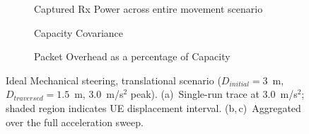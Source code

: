 \documentclass[fleqn,10pt]{wlscirep}
\begin{document}

\begin{figure}[ht!]
    \centering
    \begin{subfigure}[t]{0.49\textwidth}
        \vspace{0pt} %
        \centering
        
        \vspace{-25 pt}
        \caption{Captured Rx Power across entire movement scenario}
        \label{fig:trans_metrics_example}
    \end{subfigure}%
    \hfill
    \begin{minipage}[t]{0.49\textwidth}
        \vspace{0pt} %
        \centering
        \begin{subfigure}{\linewidth}
        
        \vspace{-25 pt}
        \caption{Capacity Covariance}
        \label{fig:trans_metrics_covariance}
        
    \end{subfigure}
    \vfill
        \begin{subfigure}{\linewidth}
        
        \vspace{-25 pt}
        \caption{Packet Overhead as a percentage of Capacity}
        \label{fig:trans_metrics_overhead}
    \end{subfigure}
    \end{minipage}
    \caption{Ideal Mechanical steering, translational scenario ($D_{initial} = 3$~m, $D_{traversed} = 1.5$~m, $3.0$~m/s$^2$ peak). (a)~Single-run trace at $3.0$~m/s$^2$; shaded region indicates UE displacement interval. (b,\,c)~Aggregated over the full acceleration sweep.}
    \label{fig:translational_metrics}
    \vspace{-10 pt}
\end{figure}
\end{document}
